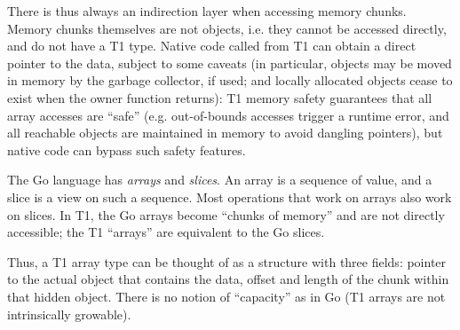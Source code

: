 There is thus always an indirection layer when accessing memory chunks.
Memory chunks themselves are not objects, i.e. they cannot be accessed
directly, and do not have a T1 type. Native code called from T1 can
obtain a direct pointer to the data, subject to some caveats (in
particular, objects may be moved in memory by the garbage collector, if
used; and locally allocated objects cease to exist when the owner
function returns): T1 memory safety guarantees that all array accesses
are ``safe'' (e.g. out-of-bounds accesses trigger a runtime error, and
all reachable objects are maintained in memory to avoid dangling
pointers), but native code can bypass such safety features.

\begin{rationale}
The Go language has \emph{arrays} and \emph{slices}. An array is a
sequence of value, and a slice is a view on such a sequence. Most
operations that work on arrays also work on slices. In T1, the Go arrays
become ``chunks of memory'' and are not directly accessible; the T1
``arrays'' are equivalent to the Go slices.

Thus, a T1 array type can be thought of as a structure with three
fields: pointer to the actual object that contains the data, offset and
length of the chunk within that hidden object. There is no notion of
``capacity'' as in Go (T1 arrays are not intrinsically growable).
\end{rationale}

